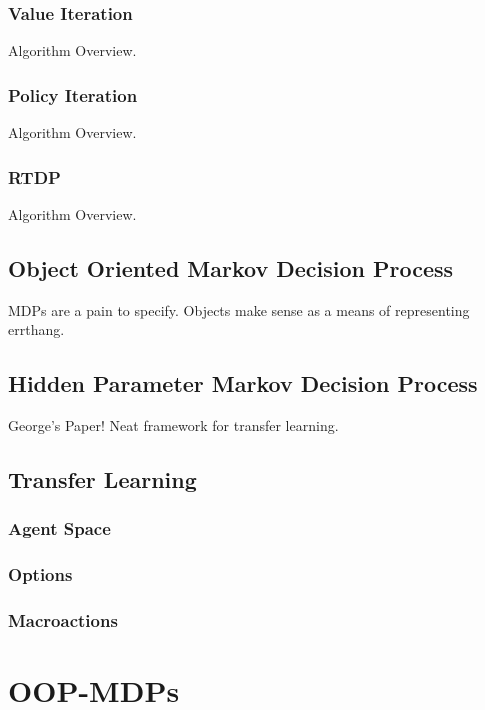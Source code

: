 \documentclass[11pt]{article}
\begin{document}
\subsubsection{Value Iteration}

Algorithm Overview.

\subsubsection{Policy Iteration}

Algorithm Overview.

\subsubsection{RTDP}

Algorithm Overview.

\subsection{Object Oriented Markov Decision Process}

MDPs are a pain to specify. Objects make sense as a means of representing errthang.

\subsection{Hidden Parameter Markov Decision Process}

George's Paper! Neat framework for transfer learning.\cite{konidaris2014hidden}


\subsection{Transfer Learning}

\subsubsection{Agent Space}
\subsubsection{Options}
\subsubsection{Macroactions}



\section{OOP-MDPs}
\label{sec:oop_mdps}
\end{document}

